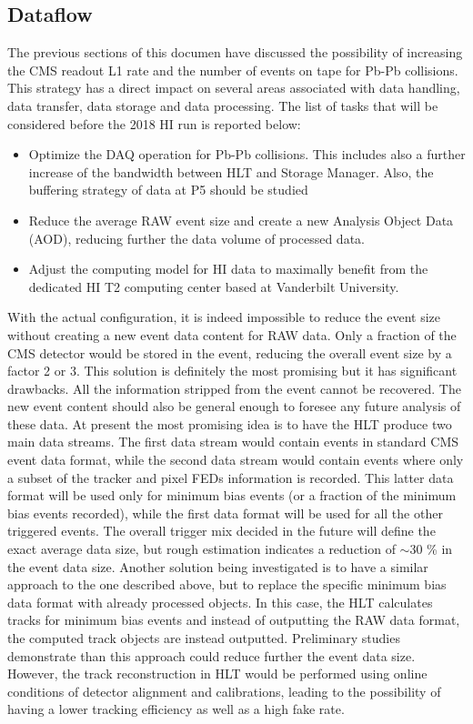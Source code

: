 \subsection{Dataflow\label{subsec:dataflow}} 
The previous sections of this documen have discussed the possibility of increasing the CMS readout L1 rate and the number of 
events on tape for Pb-Pb collisions. This strategy has a direct impact on several areas associated with data handling, 
data transfer, data storage and data processing. The
list of tasks that will be considered before the 2018 HI run is reported below:

\begin{itemize} \item Optimize the DAQ operation for Pb-Pb collisions. This includes also a further increase of the
bandwidth between HLT and Storage Manager. Also, the buffering strategy of data at P5 should be studied

\item Reduce the average RAW event size and create a new Analysis Object Data (AOD), reducing further the data volume of
processed data.

\item Adjust the computing model for HI data to maximally benefit from the dedicated HI T2 computing center based at
Vanderbilt University. \end{itemize}

With the actual configuration, it is indeed impossible to reduce the event size without creating a new
event data content for RAW data. Only a fraction of the CMS detector would be stored in the event, reducing the overall
event size by a factor 2 or 3. This solution is definitely the most promising but it has significant drawbacks. All the
information stripped from the event cannot be recovered. The new event content should also be general enough to foresee
any future analysis of these data. At present the most promising idea is to have the HLT produce two main data streams.
The first data stream would contain events in standard CMS event data format, while the second data stream would contain
events where only a subset of the tracker and pixel FEDs information is recorded. This latter data format will be used
only for minimum bias events (or a fraction of the minimum bias events recorded), while the first data format will be
used for all the other triggered events. The overall trigger mix decided in the future will define the exact average
data size, but rough estimation indicates a reduction of $\sim 30$ \% in the event data size. Another solution being
investigated is to have a similar approach to the one described above, but to replace the specific minimum bias data
format with already processed objects. In this case, the HLT calculates tracks for minimum bias events and instead of
outputting the RAW data format, the computed track objects are instead outputted. Preliminary studies demonstrate than
this approach could reduce further the event data size. However, the track reconstruction in HLT would be performed
using online conditions of detector alignment and calibrations, leading to the possibility of having a lower tracking
efficiency as well as a high fake rate.

